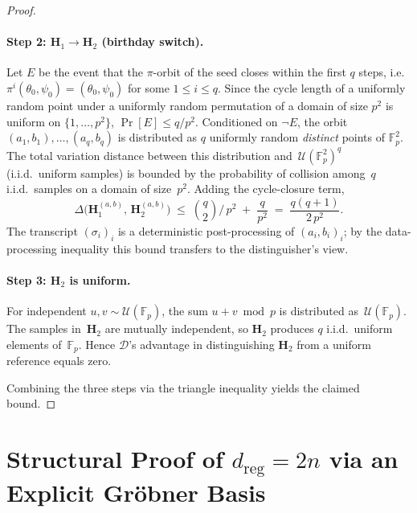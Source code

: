 \documentclass[11pt,a4paper]{article}
\theoremstyle{definition}
\newcommand{\Fp}{\mathbb{F}_p}
\begin{document}
\begin{proof}
\paragraph{Step 2: $\mathbf{H}_1\!\to\!\mathbf{H}_2$ (birthday switch).}
Let $E$ be the event that the $\pi$-orbit of the seed closes within
the first $q$ steps, i.e.\ $\pi^{i}(\theta_0,\psi_0) =
(\theta_0,\psi_0)$ for some $1 \le i \le q$. Since the cycle length
of a uniformly random point under a uniformly random permutation of
a domain of size $p^2$ is uniform on $\{1, \ldots, p^2\}$,
$\Pr[E] \le q/p^{2}$. Conditioned on $\lnot E$, the orbit
$(a_1,b_1),\dots,(a_q,b_q)$ is
distributed as $q$ uniformly random \emph{distinct} points of
$\Fp^{2}$. The total variation distance between this distribution
and~$\mathcal U(\Fp^{2})^{q}$ (i.i.d.\ uniform samples) is bounded by
the probability of collision among~$q$ i.i.d.\ samples on a domain of
size~$p^{2}$. Adding the cycle-closure term,
\[
  \Delta\bigl(\mathbf H_1^{(a,b)},\,\mathbf H_2^{(a,b)}\bigr)
  \;\le\;\binom{q}{2}\Big/\,p^{2} \;+\; \frac{q}{p^{2}}
  \;=\;\frac{q(q+1)}{2\,p^{2}}.
\]
The transcript $(\sigma_i)_i$ is a deterministic post-processing of
$(a_i,b_i)_i$; by the data-processing inequality this bound transfers
to the distinguisher's view.

\paragraph{Step 3: $\mathbf{H}_2$ is uniform.}
For independent $u,v\!\sim\!\mathcal U(\Fp)$, the sum $u+v\bmod p$ is
distributed as~$\mathcal U(\Fp)$. The samples in~$\mathbf{H}_2$ are
mutually independent, so $\mathbf{H}_2$ produces $q$ i.i.d.\ uniform
elements of~$\Fp$.  Hence $\mathcal D$'s advantage in distinguishing
$\mathbf{H}_2$ from a uniform reference equals zero.

Combining the three steps via the triangle inequality yields the
claimed bound.
\end{proof}


\section{Structural Proof of $d_{\mathrm{reg}} = 2n$ via an Explicit Gr\"obner Basis}\label{app:dreg_proof}
\end{document}
